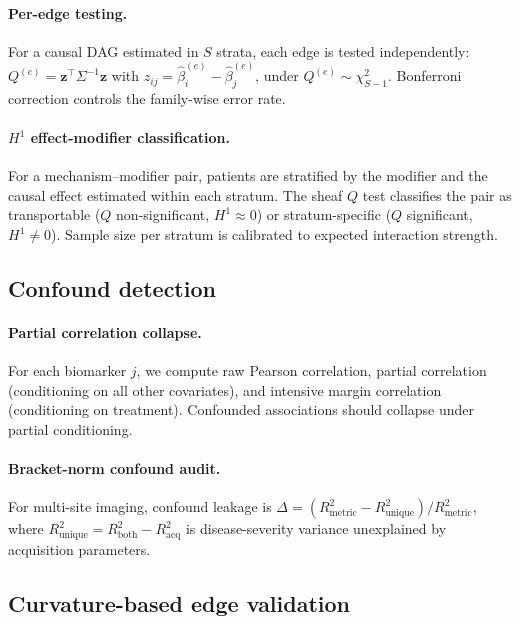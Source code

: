 \documentclass{article}
\begin{document}
\paragraph{Per-edge testing.}
For a causal DAG estimated in $S$ strata, each edge is tested independently:
$Q^{(e)} = \mathbf{z}^\top \Sigma^{-1} \mathbf{z}$ with $z_{ij} = \hat\beta_i^{(e)} - \hat\beta_j^{(e)}$, under $Q^{(e)} \sim \chi^2_{S-1}$.
Bonferroni correction controls the family-wise error rate.

\paragraph{$H^1$ effect-modifier classification.}
For a mechanism--modifier pair, patients are stratified by the modifier and the causal effect estimated within each stratum.
The sheaf $Q$ test classifies the pair as transportable ($Q$ non-significant, $H^1 \approx 0$) or stratum-specific ($Q$ significant, $H^1 \neq 0$).
Sample size per stratum is calibrated to expected interaction strength.

\subsection{Confound detection}
\label{sec:meth-confound}

\paragraph{Partial correlation collapse.}
For each biomarker $j$, we compute raw Pearson correlation, partial correlation (conditioning on all other covariates), and intensive margin correlation (conditioning on treatment).
Confounded associations should collapse under partial conditioning.

\paragraph{Bracket-norm confound audit.}
For multi-site imaging, confound leakage is $\Delta = (R^2_{\mathrm{metric}} - R^2_{\mathrm{unique}}) / R^2_{\mathrm{metric}}$, where $R^2_{\mathrm{unique}} = R^2_{\mathrm{both}} - R^2_{\mathrm{acq}}$ is disease-severity variance unexplained by acquisition parameters.

\subsection{Curvature-based edge validation}
\label{sec:meth-curvature}
\end{document}
